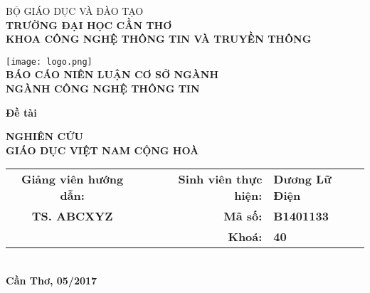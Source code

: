 \documentclass[../thesis.tex]{subfiles}
\begin{document}
\begin{titlepage}

\begin{center}

BỘ GIÁO DỤC VÀ ĐÀO TẠO\\
\textbf{TRƯỜNG ĐẠI HỌC CẦN THƠ\\}
\textbf{KHOA CÔNG NGHỆ THÔNG TIN VÀ TRUYỀN THÔNG\\[1cm]}

\texttt{[image: logo.png]}\\[1cm]

\textbf{BÁO CÁO NIÊN LUẬN CƠ SỞ NGÀNH\\}
\textbf{NGÀNH CÔNG NGHỆ THÔNG TIN\\[2cm]}

\begin{large}
\textbf{Đề tài\\[0.5cm]}
\end{large}
\textbf{{\LARGE NGHIÊN CỨU\\GIÁO DỤC VIỆT NAM CỘNG HOÀ}}
\\[4cm]

\begin{tabular}{ c c r l }
 \textbf{Giảng viên hướng dẫn:} & & \textbf{Sinh viên thực hiện:} & \textbf{Dương Lữ Điện}\\ 
 \textbf{TS. ABCXYZ} & & \textbf{Mã số:} & \textbf{B1401133}\\  
 & & \textbf{Khoá:} & \textbf{40}    
\end{tabular}
\\[4cm]

\textbf{Cần Thơ, 05/2017}

\end{center}

\end{titlepage}
\end{document}
